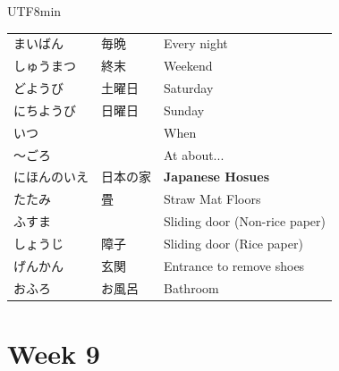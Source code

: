 \documentclass[11pt]{article}
\begin{document}
\begin{CJK}{UTF8}{min}
\begin{tabularx}{\linewidth}{X | X | X}
    まいばん & 毎晩 & Every night \\
    しゅうまつ & 終末 & Weekend \\
    どようび & 土曜日 & Saturday \\
    にちようび & 日曜日 & Sunday \\
    いつ &  & When \\
    〜ごろ &  & At about... \\
    \hline
    にほんのいえ & 日本の家 & \textbf{Japanese Hosues} \\
    たたみ & 畳 & Straw Mat Floors \\
    ふすま &  & Sliding door (Non-rice paper) \\
    しょうじ & 障子 & Sliding door (Rice paper) \\
    げんかん & 玄関 & Entrance to remove shoes \\
    おふろ & お風呂 & Bathroom \\
    \bottomrule
\end{tabularx}


\newpage
\section{Week 9}


\end{CJK}
\end{document}
